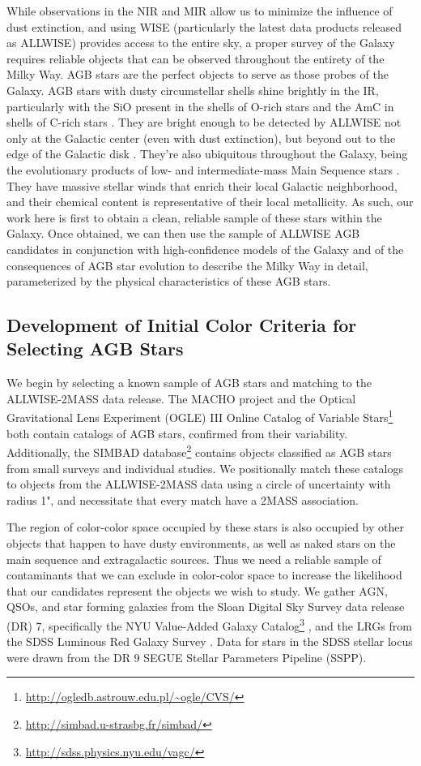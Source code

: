 While observations in the NIR and MIR allow us to minimize the influence of dust extinction, and using WISE (particularly the latest data products released as ALLWISE) provides access to the entire sky, a proper survey of the Galaxy requires reliable objects that can be observed throughout the entirety of the Milky Way. AGB stars are the perfect objects to serve as those probes of the Galaxy. AGB stars with dusty circumstellar shells shine brightly in the IR, particularly with the SiO present in the shells of O-rich stars and the AmC in shells of C-rich stars \citep{2011A&A...534A..79I}. They are bright enough to be detected by ALLWISE not only at the Galactic center (even with dust extinction), but beyond out to the edge of the Galactic disk \citep{2013RAA....13..323T}. They're also ubiquitous throughout the Galaxy, being the evolutionary products of low- and intermediate-mass Main Sequence stars \citep{1983ARA&A..21..271I}. They have massive stellar winds that enrich their local Galactic neighborhood, and their chemical content is representative of their local metallicity. As such, our work here is first to obtain a clean, reliable sample of these stars within the Galaxy. Once obtained, we can then use the sample of ALLWISE AGB candidates in conjunction with high-confidence models of the Galaxy and of the consequences of AGB star evolution to describe the Milky Way in detail, parameterized by the physical characteristics of these AGB stars.

\subsection{Development of Initial Color Criteria for Selecting AGB Stars}
We begin by selecting a known sample of AGB stars and matching to the ALLWISE-2MASS data release. The MACHO project \citep{2008AJ....136.1242F} and the Optical Gravitational Lens Experiment (OGLE) III Online Catalog of Variable Stars\footnote{\url{http://ogledb.astrouw.edu.pl/~ogle/CVS/}} both contain catalogs of AGB stars, confirmed from their variability. Additionally, the SIMBAD database\footnote{\url{http://simbad.u-strasbg.fr/simbad/}} contains objects classified as AGB stars from small surveys and individual studies. We positionally match these catalogs to objects from the ALLWISE-2MASS data using a circle of uncertainty with radius 1", and necessitate that every match have a 2MASS association.

The region of color-color space occupied by these stars is also occupied by other objects that happen to have dusty environments, as well as naked stars on the main sequence and extragalactic sources. Thus we need a reliable sample of contaminants that we can exclude in color-color space to increase the likelihood that our candidates represent the objects we wish to study. We gather AGN, QSOs, and star forming galaxies from the Sloan Digital Sky Survey \citep{2000AJ....120.1579Y} data release (DR) 7, specifically the NYU Value-Added Galaxy Catalog\footnote{\url{http://sdss.physics.nyu.edu/vagc/}} \citep[VAGC]{2005AJ....129.2562B}, and the LRGs from the SDSS Luminous Red Galaxy Survey \citep{2010ApJ...710.1444K}. Data for stars in the SDSS stellar locus \citep{2014MNRAS.440.3430D} were drawn from the DR 9 SEGUE Stellar Parameters Pipeline (SSPP).

